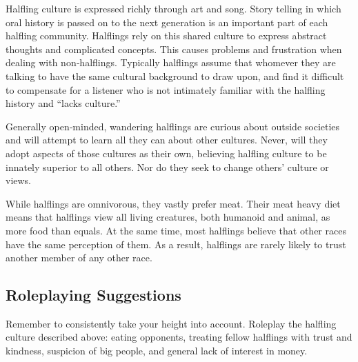 \documentclass[10pt,a4paper,twocolumn]{d20}
\begin{document}
{Halfling culture is expressed richly through art and song. Story telling in which oral history is passed on to the next generation is an important part of each halfling community. Halflings rely on this shared culture to express abstract thoughts and complicated concepts. This causes problems and frustration when dealing with non‐halflings. Typically halflings assume that whomever they are talking to have the same cultural background to draw upon, and find it difficult to compensate for a listener who is not intimately familiar with the halfling history and ``lacks culture.''

Generally open‐minded, wandering halflings are curious about outside societies and will attempt to learn all they can about other cultures. Never, will they adopt aspects of those cultures as their own, believing halfling culture to be innately superior to all others. Nor do they seek to change others’ culture or views.

While halflings are omnivorous, they vastly prefer meat. Their meat heavy diet means that halflings view all living creatures, both humanoid and animal, as more food than equals. At the same time, most halflings believe that other races have the same perception of them. As a result, halflings are rarely likely to trust another member of any other race.

\subsection{Roleplaying Suggestions}
Remember to consistently take your height into account. Roleplay the halfling culture described above: eating opponents, treating fellow halflings with trust and kindness, suspicion of big people, and general lack of interest in money.

}
\end{document}
